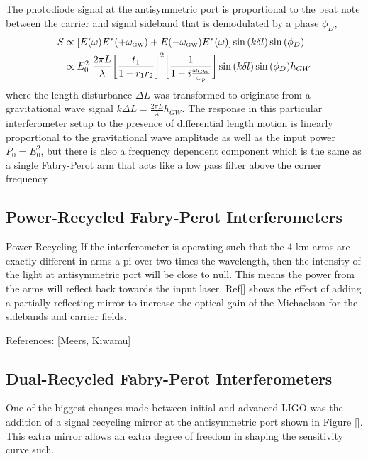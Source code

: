 		The photodiode signal at the antisymmetric port is proportional to the beat note between the carrier and signal sideband that is demodulated by a phase $\phi_{D}$,
		\begin{equation}
		\begin{aligned}
			S &\propto  [E(\omega) E^*(+\omega_{\text{\tiny GW}}) +  E(-\omega_{\text{\tiny GW}}) E^*(\omega) ] \sin{(k\delta l)} \sin{(\phi_{D})} \\
			  &\propto E_0^2 \; \frac{2\pi L}{\lambda}  \bigg[\frac{t_1}{1-r_1r_2}\bigg]^2 \bigg[\frac{1}{1 - i \frac{\omega_{\text{\tiny GW}}}{\omega_p}}\bigg] \sin{(k\delta l)} \sin{(\phi_{D})} h_{GW}
		\end{aligned}
		\end{equation}
		where the length disturbance $\Delta L$ was transformed to originate from a gravitational wave signal $k \Delta L = \frac{2\pi L}{\lambda} h_{GW} $.
		The response in this particular interferometer setup to the presence of differential length motion is linearly proportional to the gravitational wave amplitude as well as the input power $P_0 = E_0^2$, but there is also a frequency dependent component which is the same as a single Fabry-Perot arm that acts like a low pass filter above the corner frequency.

		\subsection{Power-Recycled Fabry-Perot Interferometers}
		Power Recycling
		If the interferometer is operating such that the 4 km arms are exactly different in arms a pi over two times the wavelength, then the intensity of the light at antisymmetric port will be close to null.  This means the power from the arms will reflect back towards the input laser.  Ref[] shows the effect of adding a partially reflecting mirror to increase the optical gain of the Michaelson for the sidebands and carrier fields.
		
		
		
		References: [Meers, Kiwamu]
		
		\subsection{Dual-Recycled Fabry-Perot Interferometers}\label{DRMI}
		
		One of the biggest changes made between initial and advanced LIGO was the addition of a signal recycling mirror at the antisymmetric port shown in Figure []. This extra mirror allows an extra degree of freedom in shaping the sensitivity curve such.
		
